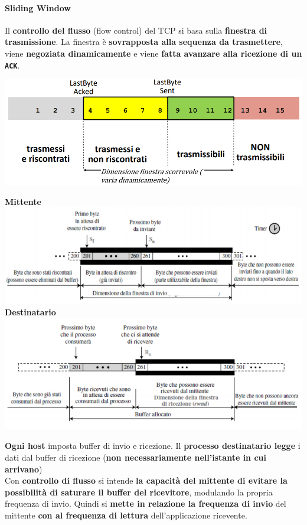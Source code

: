 \documentclass[10pt]{article}
\begin{document}
\paragraph{Sliding Window} Il \textbf{controllo del flusso} (flow control) del TCP si basa sulla \textbf{finestra di trasmissione}. La finestra è \textbf{sovrapposta alla sequenza da trasmettere}, viene \textbf{negoziata dinamicamente} e viene \textbf{fatta avanzare alla ricezione di un \texttt{ACK}}.\\
\begin{center}
\includegraphics[scale=0.7]{tcpwindow.png}
\end{center}
\pagebreak
\begin{center}
\textbf{Mittente}\\
\includegraphics[scale=0.7]{tcpwindow2.png}\\
\textbf{Destinatario}\\
\includegraphics[scale=0.7]{tcpwindow3.png}
\end{center}
\textbf{Ogni host} imposta buffer di invio e ricezione. Il \textbf{processo destinatario legge} i dati dal buffer di ricezione (\textbf{non necessariamente nell'istante in cui arrivano})\\
Con \textbf{controllo di flusso} si intende \textbf{la capacità del mittente di evitare la possibilità di saturare il buffer del ricevitore}, modulando la propria frequenza di invio. Quindi si \textbf{mette in relazione la frequenza di invio} del mittente \textbf{con al frequenza di lettura} dell'applicazione ricevente.
\end{document}
